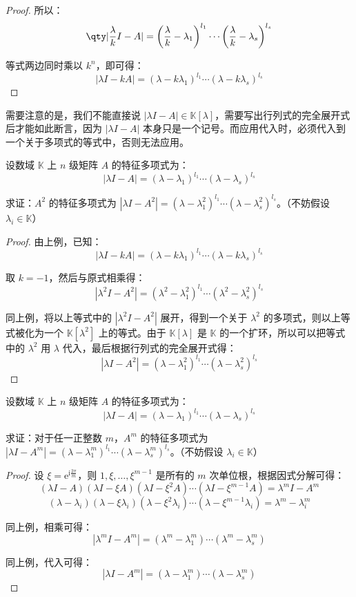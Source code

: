 \begin{proof}
	所以：
	$$
	\qty|\dfrac{\lambda}{k} I - A| = \biggl( \dfrac{\lambda}{k} - \lambda_1 \biggr)^{l_1} \cdots \biggl( \dfrac{\lambda}{k} - \lambda_s \biggr)^{l_s}
	$$

	等式两边同时乘以 $k^n$，即可得：
	$$
	|\lambda I - kA| = (\lambda - k \lambda_1)^{l_1} \cdots (\lambda - k \lambda_s)^{l_s}
	$$
\end{proof}

需要注意的是，我们不能直接说 $|\lambda I - A| \in \mathbb K[\lambda]$，需要写出行列式的完全展开式后才能如此断言，因为 $|\lambda I - A|$ 本身只是一个记号。而应用代入时，必须代入到一个关于多项式的等式中，否则无法应用。

\begin{exercise}
	设数域 $\mathbb K$ 上 $n$ 级矩阵 $A$ 的特征多项式为：
	$$
	|\lambda I - A| = (\lambda - \lambda_1)^{l_1} \cdots (\lambda - \lambda_s)^{l_s}
	$$

	求证：$A^2$ 的特征多项式为 $|\lambda I - A^2| = (\lambda - \lambda_1^2)^{l_1} \cdots (\lambda - \lambda_s^2)^{l_s}$。（不妨假设 $\lambda_i \in \mathbb K$）
\end{exercise}

\begin{proof}
	由上例，已知：
	$$
	|\lambda I - kA| = (\lambda - k \lambda_1)^{l_1} \cdots (\lambda - k \lambda_s)^{l_s}
	$$

	取 $k = -1$，然后与原式相乘得：
	$$
	|\lambda^2 I - A^2| = (\lambda^2 - \lambda_1^2)^{l_1} \cdots (\lambda^2 - \lambda_s^2)^{l_s}
	$$

	同上例，将以上等式中的 $|\lambda^2 I - A^2|$ 展开，得到一个关于 $\lambda^2$ 的多项式，则以上等式被化为一个 $\mathbb K[\lambda^2]$ 上的等式。由于 $\mathbb K[\lambda]$ 是 $\mathbb K$ 的一个扩环，所以可以把等式中的 $\lambda^2$ 用 $\lambda$ 代入，最后根据行列式的完全展开式得：
	$$
	|\lambda I - A^2| = (\lambda - \lambda_1^2)^{l_1} \cdots (\lambda - \lambda_s^2)^{l_s}
	$$
\end{proof}

\begin{exercise}
	设数域 $\mathbb K$ 上 $n$ 级矩阵 $A$ 的特征多项式为：
	$$
	|\lambda I - A| = (\lambda - \lambda_1)^{l_1} \cdots (\lambda - \lambda_s)^{l_s}
	$$

	求证：对于任一正整数 $m$，$A^m$ 的特征多项式为 $|\lambda I - A^m| = (\lambda - \lambda_1^m)^{l_1} \cdots (\lambda - \lambda_s^m)^{l_s}$。（不妨假设 $\lambda_i \in \mathbb K$）
\end{exercise}

\begin{proof}
	设 $\xi = \mathrm e^{\mathrm i \frac{2\pi}{m}}$，则 $1, \xi, \ldots, \xi^{m - 1}$ 是所有的 $m$ 次单位根，根据因式分解可得：
	$$
	(\lambda I - A)(\lambda I - \xi A)(\lambda I - \xi^2 A) \cdots (\lambda I - \xi^{m - 1} A) = \lambda^m I - A^m
	$$$$
	(\lambda - \lambda_i)(\lambda - \xi \lambda_i)(\lambda - \xi^2 \lambda_i) \cdots (\lambda - \xi^{m - 1} \lambda_i) = \lambda^m - \lambda_i^m
	$$

	同上例，相乘可得：
	$$
	|\lambda^m I - A^m| = (\lambda^m - \lambda_1^m) \cdots (\lambda^m - \lambda_s^m)
	$$

	同上例，代入可得：
	$$
	|\lambda I - A^m| = (\lambda - \lambda_1^m) \cdots (\lambda - \lambda_s^m)
	$$
\end{proof}